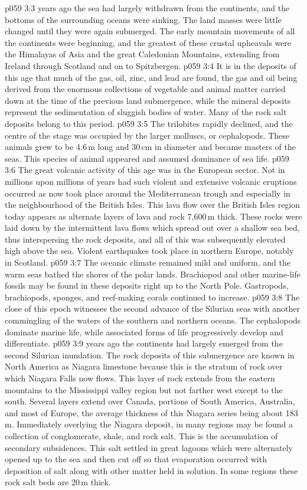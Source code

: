 \vs p059 3:3 \pc {} years ago the sea had largely withdrawn from the continents, and the bottoms of the surrounding oceans were sinking. The land masses were little changed until they were again submerged. The early mountain movements of all the continents were beginning, and the greatest of these crustal upheavals were the Himalayas of Asia and the great Caledonian Mountains, extending from Ireland through Scotland and on to Spitzbergen.
\vs p059 3:4 It is in the deposits of this age that much of the gas, oil, zinc, and lead are found, the gas and oil being derived from the enormous collections of vegetable and animal matter carried down at the time of the previous land submergence, while the mineral deposits represent the sedimentation of sluggish bodies of water. Many of the rock salt deposits belong to this period.
\vs p059 3:5 The trilobites rapidly declined, and the centre of the stage was occupied by the larger molluscs, or cephalopods. These animals grew to be 4.6\,m long and 30\,cm in diameter and became masters of the seas. This species of animal appeared  and assumed dominance of sea life.
\vs p059 3:6 The great volcanic activity of this age was in the European sector. Not in millions upon millions of years had such violent and extensive volcanic eruptions occurred as now took place around the Mediterranean trough and especially in the neighbourhood of the British Isles. This lava flow over the British Isles region today appears as alternate layers of lava and rock 7,600\,m thick. These rocks were laid down by the intermittent lava flows which spread out over a shallow sea bed, thus interspersing the rock deposits, and all of this was subsequently elevated high above the sea. Violent earthquakes took place in northern Europe, notably in Scotland.
\vs p059 3:7 The oceanic climate remained mild and uniform, and the warm seas bathed the shores of the polar lands. Brachiopod and other marine\hyp{}life fossils may be found in these deposits right up to the North Pole. Gastropods, brachiopods, sponges, and reef\hyp{}making corals continued to increase.
\vs p059 3:8 The close of this epoch witnesses the second advance of the Silurian seas with another commingling of the waters of the southern and northern oceans. The cephalopods dominate marine life, while associated forms of life progressively develop and differentiate.
\vs p059 3:9 \pc {} years ago the continents had largely emerged from the second Silurian inundation. The rock deposits of this submergence are known in North America as Niagara limestone because this is the stratum of rock over which Niagara Falls now flows. This layer of rock extends from the eastern mountains to the Mississippi valley region but not farther west except to the south. Several layers extend over Canada, portions of South America, Australia, and most of Europe, the average thickness of this Niagara series being about 183\,m. Immediately overlying the Niagara deposit, in many regions may be found a collection of conglomerate, shale, and rock salt. This is the accumulation of secondary subsidences. This salt settled in great lagoons which were alternately opened up to the sea and then cut off so that evaporation occurred with deposition of salt along with other matter held in solution. In some regions these rock salt beds are 20\,m thick.
